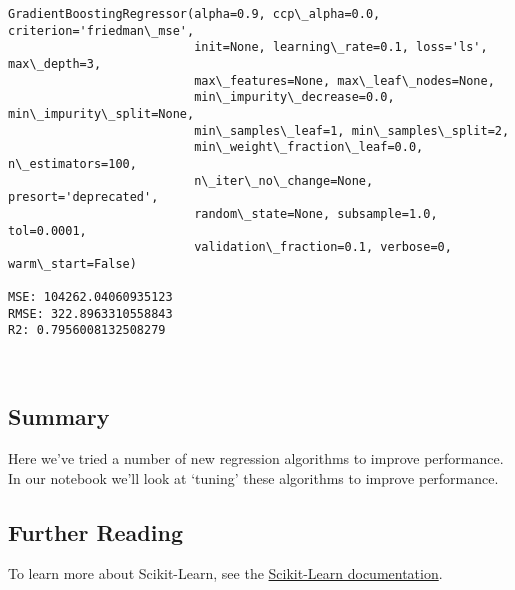 \documentclass[11pt]{article}
\makeatletter
\newcommand{\boxspacing}{\kern\kvtcb@left@rule\kern\kvtcb@boxsep}
\newcommand{\prompt}[4]{
        {\ttfamily\llap{{\color{#2}[#3]:\hspace{3pt}#4}}\vspace{-\baselineskip}}
    }
\makeatother
\begin{document}
    \begin{Verbatim}[commandchars=\\\{\}]
GradientBoostingRegressor(alpha=0.9, ccp\_alpha=0.0, criterion='friedman\_mse',
                          init=None, learning\_rate=0.1, loss='ls', max\_depth=3,
                          max\_features=None, max\_leaf\_nodes=None,
                          min\_impurity\_decrease=0.0, min\_impurity\_split=None,
                          min\_samples\_leaf=1, min\_samples\_split=2,
                          min\_weight\_fraction\_leaf=0.0, n\_estimators=100,
                          n\_iter\_no\_change=None, presort='deprecated',
                          random\_state=None, subsample=1.0, tol=0.0001,
                          validation\_fraction=0.1, verbose=0, warm\_start=False)

MSE: 104262.04060935123
RMSE: 322.8963310558843
R2: 0.7956008132508279
    \end{Verbatim}

    \begin{center}
    \end{center}
    { \hspace*{\fill} \\}
    
    \hypertarget{summary}{%
\subsection{Summary}\label{summary}}

Here we've tried a number of new regression algorithms to improve
performance. In our notebook we'll look at `tuning' these algorithms to
improve performance.

\hypertarget{further-reading}{%
\subsection{Further Reading}\label{further-reading}}

To learn more about Scikit-Learn, see the
\href{https://scikit-learn.org/stable/modules/model_evaluation.html\#regression-metrics}{Scikit-Learn
documentation}.

    \begin{tcolorbox}[breakable, size=fbox, boxrule=1pt, pad at break*=1mm,colback=cellbackground, colframe=cellborder]
\prompt{In}{incolor}{ }{\boxspacing}
\begin{Verbatim}[commandchars=\\\{\}]

\end{Verbatim}
\end{tcolorbox}


    
    
    
\end{document}
